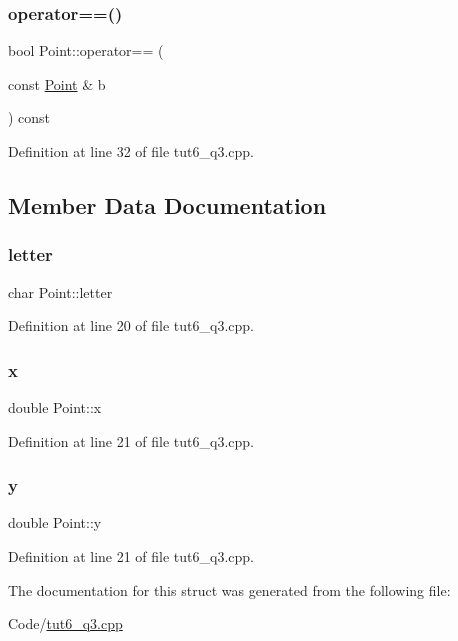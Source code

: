 \mbox{\label{struct_point_affed2941d46a0f1bfe40540506e99e5e}} 
\subsubsection{\texorpdfstring{operator==()}{operator==()}}
{\footnotesize\ttfamily bool Point\+::operator== (\begin{DoxyParamCaption}\item[{const \hyperlink{struct_point}{Point} \&}]{b }\end{DoxyParamCaption}) const\hspace{0.3cm}{\ttfamily [inline]}}



Definition at line 32 of file tut6\+\_\+q3.\+cpp.



\subsection{Member Data Documentation}
\mbox{\label{struct_point_ac0df42bfe41b1cc24cca14a53b96ae16}} 
\subsubsection{\texorpdfstring{letter}{letter}}
{\footnotesize\ttfamily char Point\+::letter}



Definition at line 20 of file tut6\+\_\+q3.\+cpp.

\mbox{\label{struct_point_ab99c56589bc8ad5fa5071387110a5bc7}} 
\subsubsection{\texorpdfstring{x}{x}}
{\footnotesize\ttfamily double Point\+::x}



Definition at line 21 of file tut6\+\_\+q3.\+cpp.

\mbox{\label{struct_point_afa38be143ae800e6ad69ce8ed4df62d8}} 
\subsubsection{\texorpdfstring{y}{y}}
{\footnotesize\ttfamily double Point\+::y}



Definition at line 21 of file tut6\+\_\+q3.\+cpp.



The documentation for this struct was generated from the following file\+:\begin{DoxyCompactItemize}
\item 
Code/\hyperlink{tut6__q3_8cpp}{tut6\+\_\+q3.\+cpp}\end{DoxyCompactItemize}
